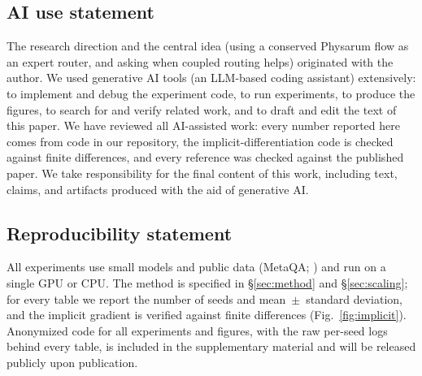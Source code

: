 \documentclass{article} %
\begin{document}
\subsection*{AI use statement}
The research direction and the central idea (using a conserved Physarum flow as an expert router,
and asking when coupled routing helps) originated with the author. We used generative AI tools
(an LLM-based coding assistant) extensively: to implement and debug the experiment code, to run
experiments, to produce the figures, to search for and verify related work, and to draft and edit
the text of this paper. We have reviewed all AI-assisted work: every number reported here comes
from code in our repository, the implicit-differentiation code is checked against finite
differences, and every reference was checked against the published paper. We take responsibility
for the final content of this work, including text, claims, and artifacts produced with the aid of
generative AI.

\subsection*{Reproducibility statement}
All experiments use small models and public data (MetaQA; \citealp{zhang2018metaqa}) and run on a
single GPU or CPU. The method is specified in \S\ref{sec:method} and \S\ref{sec:scaling}; for every
table we report the number of seeds and mean~$\pm$~standard deviation, and the implicit gradient is
verified against finite differences (Fig.~\ref{fig:implicit}). Anonymized code for all experiments and figures, with the raw per-seed
logs behind every table, is included in the supplementary material and will be released publicly
upon publication.



\end{document}

